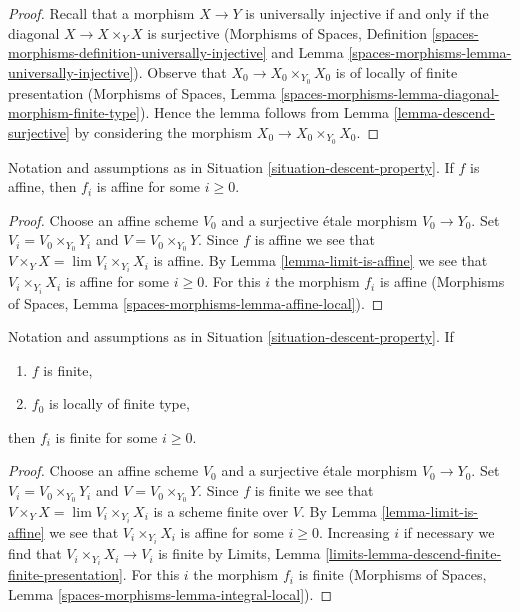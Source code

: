 \begin{proof}
Recall that a morphism $X \to Y$ is universally injective if and
only if the diagonal $X \to X \times_Y X$ is surjective
(Morphisms of Spaces, Definition
\ref{spaces-morphisms-definition-universally-injective} and
Lemma \ref{spaces-morphisms-lemma-universally-injective}).
Observe that $X_0 \to X_0 \times_{Y_0} X_0$ is of locally of finite
presentation (Morphisms of Spaces, Lemma
\ref{spaces-morphisms-lemma-diagonal-morphism-finite-type}).
Hence the lemma follows from Lemma \ref{lemma-descend-surjective}
by considering the morphism $X_0 \to X_0 \times_{Y_0} X_0$.
\end{proof}

\begin{lemma}
\label{lemma-descend-affine}
Notation and assumptions as in Situation \ref{situation-descent-property}. If
$f$ is affine, then $f_i$ is affine for some $i \geq 0$.
\end{lemma}

\begin{proof}
Choose an affine scheme $V_0$ and a surjective \'etale morphism $V_0 \to Y_0$.
Set $V_i = V_0 \times_{Y_0} Y_i$ and $V = V_0 \times_{Y_0} Y$.
Since $f$ is affine we see that $V \times_Y X = \lim V_i \times_{Y_i} X_i$
is affine. By Lemma \ref{lemma-limit-is-affine} we see that
$V_i \times_{Y_i} X_i$ is affine for some $i \geq 0$. For this $i$ the morphism
$f_i$ is affine
(Morphisms of Spaces, Lemma \ref{spaces-morphisms-lemma-affine-local}).
\end{proof}

\begin{lemma}
\label{lemma-descend-finite}
Notation and assumptions as in Situation \ref{situation-descent-property}. If
\begin{enumerate}
\item $f$ is finite,
\item $f_0$ is locally of finite type,
\end{enumerate}
then $f_i$ is finite for some $i \geq 0$.
\end{lemma}

\begin{proof}
Choose an affine scheme $V_0$ and a surjective \'etale morphism $V_0 \to Y_0$.
Set $V_i = V_0 \times_{Y_0} Y_i$ and $V = V_0 \times_{Y_0} Y$.
Since $f$ is finite we see that $V \times_Y X = \lim V_i \times_{Y_i} X_i$
is a scheme finite over $V$. By Lemma \ref{lemma-limit-is-affine} we see that
$V_i \times_{Y_i} X_i$ is affine for some $i \geq 0$. Increasing $i$ if
necessary we find that $V_i \times_{Y_i} X_i \to V_i$ is finite by
Limits, Lemma \ref{limits-lemma-descend-finite-finite-presentation}.
For this $i$ the morphism $f_i$ is finite
(Morphisms of Spaces, Lemma \ref{spaces-morphisms-lemma-integral-local}).
\end{proof}

